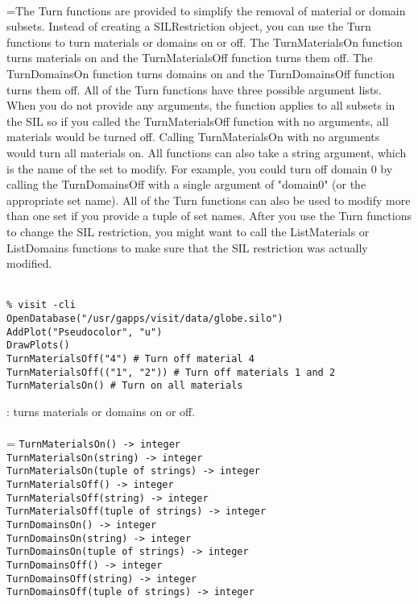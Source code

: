 \documentclass[10pt,a4paper]{report}
\begin{document}
 \\ 
\hangindent=\parindent The Turn functions are provided to simplify the removal of material or domain subsets. Instead of creating a SILRestriction object, you can use the Turn functions to turn materials or domains on or off. The TurnMaterialsOn function turns materials on and the TurnMaterialsOff function turns them off. The TurnDomainsOn function turns domains on and the TurnDomainsOff function turns them off. All of the Turn functions have three possible argument lists. When you do not provide any arguments, the function applies to all subsets in the SIL so if you called the TurnMaterialsOff function with no arguments, all materials would be turned off. Calling TurnMaterialsOn with no arguments would turn all materials on. All functions can also take a string argument, which is the name of the set to modify. For example, you could turn off domain 0 by calling the TurnDomainsOff with a single argument of "domain0" (or the appropriate set name). All of the Turn functions can also be used to modify more than one set if you provide a tuple of set names. After you use the Turn functions to change the SIL restriction, you might want to call the ListMaterials or ListDomains functions to make sure that the SIL restriction was actually modified. \\[-3mm] 

\\[-6mm]
\begin{verbatim}% visit -cli
OpenDatabase("/usr/gapps/visit/data/globe.silo")
AddPlot("Pseudocolor", "u")
DrawPlots()
TurnMaterialsOff("4") # Turn off material 4
TurnMaterialsOff(("1", "2")) # Turn off materials 1 and 2
TurnMaterialsOn() # Turn on all materials
\end{verbatim}
\newpage


{}
: turns materials or domains on or off.\\[-3mm]

 \\ 
\hangindent=\parindent 
\verb!TurnMaterialsOn() -> integer!\\ 
\verb!TurnMaterialsOn(string) -> integer!\\ 
\verb!TurnMaterialsOn(tuple of strings) -> integer!\\ 
\verb!TurnMaterialsOff() -> integer!\\ 
\verb!TurnMaterialsOff(string) -> integer!\\ 
\verb!TurnMaterialsOff(tuple of strings) -> integer!\\ 
\verb!TurnDomainsOn() -> integer!\\ 
\verb!TurnDomainsOn(string) -> integer!\\ 
\verb!TurnDomainsOn(tuple of strings) -> integer!\\ 
\verb!TurnDomainsOff() -> integer!\\ 
\verb!TurnDomainsOff(string) -> integer!\\ 
\verb!TurnDomainsOff(tuple of strings) -> integer!\\ [-3mm]
\end{document}
